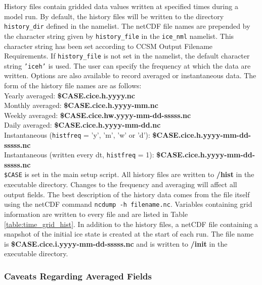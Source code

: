 
History files contain gridded data values written at specified times
during a model run.  By default, the history files will be written to
the directory {\tt history\_dir} defined in the namelist. 
The netCDF file names are prepended by the character
string given by {\tt history\_file} in the {\tt ice\_nml} namelist.
This character string has been set according to CCSM Output Filename Requirements.
If {\tt history\_file} is not set in the namelist, the default character string
{\tt 'iceh'} is used. The user can specify the frequency at which the data
are written. Options are also available to record averaged or instantaneous data.
The form of the history file names are as follows: \\

\noindent Yearly averaged:  {\bf \$CASE.cice.h.yyyy.nc} \\
Monthly averaged: {\bf \$CASE.cice.h.yyyy-mm.nc} \\
Weekly averaged: {\bf \$CASE.cice.hw.yyyy-mm-dd-sssss.nc} \\
Daily averaged: {\bf \$CASE.cice.h.yyyy-mm-dd.nc} \\
Instantaneous ({\tt histfreq} = 'y', 'm', 'w' or 'd'): {\bf \$CASE.cice.h.yyyy-mm-dd-sssss.nc} \\
Instantaneous (written every dt, {\tt histfreq} = 1): {\bf \$CASE.cice.h.yyyy-mm-dd-sssss.nc} \\

{\tt \$CASE} is set in the main setup script. All history files are written
to {\bf /hist} in the executable directory.  Changes to the frequency and
averaging will affect all output fields.  The best description
of the history data comes from the file itself using the netCDF command
{\tt ncdump -h filename.nc}.  Variables containing grid information are
written to every file and are listed in Table \ref{table:time_grid_hist}.
In addition to the history files, a netCDF file containing a snapshot
of the initial ice state is created at the start of each run.  The file
name is {\bf \$CASE.cice.i.yyyy-mm-dd-sssss.nc} and is written to 
{\bf /init} in the executable directory.

\subsubsection{Caveats Regarding Averaged Fields} 
\label{avg_fields}

